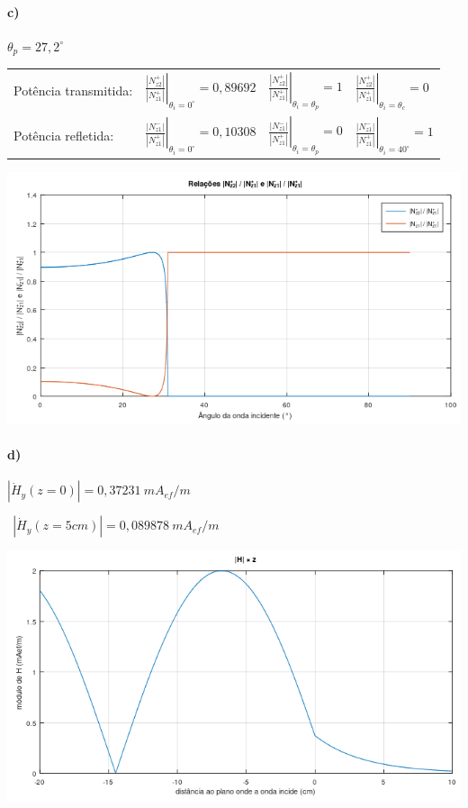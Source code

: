 \documentclass[12pt,a4paper]{article}
\begin{document}
\paragraph{c)}

$\theta_p=27,2^\circ$

    \begin{tabular}{llll}
         Potência transmitida: &$\left.\frac{|N^+_{z2}|}{|N^+_{z1}|}\right|_{\theta_i=0^\circ}=0,89692$&$ \left.\frac{|N^+_{z2}|}{|N^+_{z1}|}\right|_{\theta_i=\theta_p}=1$&$\left.\frac{|N^+_{z2}|}{|N^+_{z1}|}\right|_{\theta_i=\theta_c}=0$\\

         
         Potência refletida: &$\left.\frac{|N^-_{z1}|}{|N^+_{z1}|}\right|_{\theta_i=0^\circ}=0,10308$&$ \left.\frac{|N^-_{z1}|}{|N^+_{z1}|}\right|_{\theta_i=\theta_p}=0$&$\left.\frac{|N^-_{z1}|}{|N^+_{z1}|}\right|_{\theta_i=40^\circ}=1$\\
    \end{tabular}

\begin{center}
    \includegraphics[scale=.9]{item c.png}
\end{center}

\break

\paragraph{d)}

$|\dot H_y(z=0)|=0,37231\ mA_{ef}/m$

$\ \ |\dot H_y(z=5cm)|=0,089878\ mA_{ef}/m$

\begin{center}
    \includegraphics[scale=.9]{item d.png}
\end{center}
\end{document}
